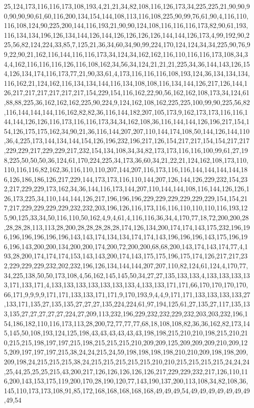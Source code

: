 25,124,173,116,116,173,108,193,4,21,21,34,82,108,116,126,173,34,225,225,21,90,90,90,90,90,90,61,60,116,200,134,154,144,108,113,116,108,225,90,99,76,61,90,4,116,110,116,108,124,90,225,200,144,116,193,21,90,90,124,108,116,116,116,173,82,90,61,193,116,134,134,196,126,134,144,126,144,126,126,126,126,144,144,126,173,4,99,192,90,225,56,82,124,224,33,85,7,125,21,36,34,60,34,90,99,224,170,124,124,34,34,225,90,76,99,22,90,21,162,116,144,116,116,173,34,124,34,162,162,116,110,116,116,173,108,34,34,4,162,116,116,116,126,116,108,162,34,56,34,124,21,21,21,225,34,36,144,143,126,154,126,134,174,116,173,77,21,90,33,61,4,173,116,116,116,108,193,124,36,134,134,134,116,162,21,124,162,116,134,134,144,116,134,108,108,116,134,144,126,217,126,144,126,217,217,217,217,217,217,154,229,154,116,162,22,90,56,162,162,108,173,34,124,61,88,88,225,36,162,162,162,225,90,224,9,124,162,108,162,225,225,100,99,90,225,56,82,116,144,144,144,116,162,82,82,36,116,144,182,207,105,173,9,162,173,173,116,116,144,144,126,126,116,173,116,116,173,34,34,162,108,36,116,144,144,126,196,217,154,154,126,175,175,162,34,90,21,36,116,144,207,207,110,144,174,108,50,144,126,144,110,36,4,225,173,144,134,144,154,126,196,232,196,217,126,154,217,217,154,154,217,217,229,229,217,229,229,217,232,154,134,108,34,34,82,173,173,116,116,100,99,61,27,198,225,50,50,50,36,124,61,170,224,225,34,173,36,60,34,21,22,21,124,162,108,173,110,110,116,116,82,162,36,116,110,110,207,144,207,116,173,116,116,144,144,144,144,186,126,186,186,126,217,229,144,173,173,116,110,144,207,126,144,126,229,232,154,232,217,229,229,173,162,34,36,144,116,173,144,207,110,144,144,108,116,144,126,126,126,173,225,34,110,144,144,126,217,196,196,196,229,229,229,229,229,229,154,154,217,217,229,229,229,229,232,232,203,196,126,116,173,116,116,110,110,110,116,193,125,90,125,33,34,50,116,110,50,162,4,9,4,61,4,116,116,36,34,4,170,77,18,72,200,200,28,28,28,28,113,113,28,200,28,28,28,28,28,174,126,134,200,174,174,143,175,232,196,196,196,196,196,196,196,143,143,174,134,134,174,174,143,196,196,196,143,175,196,196,196,143,200,200,134,200,200,174,200,72,200,200,68,68,200,143,174,143,174,77,4,193,28,200,174,174,174,153,143,143,200,174,143,175,175,196,175,174,126,217,217,232,229,229,229,232,202,232,196,126,134,144,144,207,207,110,82,124,61,124,4,170,77,34,225,138,50,50,173,108,4,56,162,145,145,50,34,27,27,135,133,133,4,133,133,133,133,171,133,171,4,133,133,133,133,133,133,133,4,133,133,171,171,66,170,170,170,170,66,171,9,9,9,9,171,171,133,133,171,171,9,170,193,9,4,4,9,171,171,133,133,133,133,27,133,171,135,27,135,135,27,27,27,135,224,224,61,97,194,125,61,27,135,27,117,135,133,135,27,27,27,27,27,224,27,209,113,232,196,229,232,232,229,232,203,203,232,196,154,186,182,110,116,173,113,28,200,72,77,77,77,68,18,108,108,82,36,36,162,82,173,145,145,50,108,193,124,125,198,43,43,43,43,43,43,198,198,215,210,210,198,215,210,210,215,215,198,197,197,215,198,215,215,215,210,209,209,125,209,209,209,210,209,125,209,197,197,197,215,38,24,24,215,24,59,198,198,198,198,210,210,209,198,198,209,209,198,24,215,215,215,38,24,215,215,215,215,215,210,210,215,215,215,215,24,24,24,25,44,25,25,25,215,43,200,217,126,126,126,126,126,217,229,229,232,217,126,110,116,200,143,153,175,119,200,170,28,190,120,77,143,190,137,200,113,108,34,82,108,36,145,110,173,173,108,91,85,172,168,168,168,168,168,49,49,49,54,49,49,49,49,49,49,49,49,54